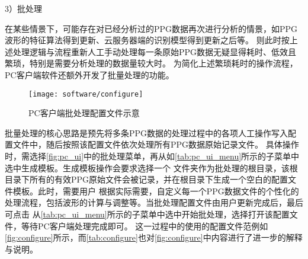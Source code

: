 3）批处理

在某些情景下，可能存在对已经分析过的PPG数据再次进行分析的情景，如PPG波形的特征算法得到更新、云服务器端的识别模型得到更新之后等。
则此时按上述处理逻辑与流程重新人工手动处理每一条原始PPG数据无疑显得耗时、低效且繁琐，特别是需要分析处理的数据量较大时。
为简化上述繁琐耗时的操作流程，PC客户端软件还额外开发了批量处理的功能。

\begin{figure}[htbp]
    \centering
    \texttt{[image: software/configure]}
    \caption{\label{fig:configure}PC客户端批处理配置文件示意}
\end{figure}

批量处理的核心思路是预先将多条PPG数据的处理过程中的各项人工操作写入配置文件中，随后按照该配置文件依次处理所有PPG数据原始记录文件。
具体操作时，需选择\autoref{fig:pc_ui}中的批处理菜单，再从如\autoref{tab:pc_ui_menu}所示的子菜单中选中生成模板。生成模板操作会要求选择一个
文件夹作为批处理的根目录，该根目录下所有的有效PPG原始文件会被记录，并在根目录下生成一个空白的配置文件模板。此时，需要用户
根据实际需要，自定义每一个PPG数据文件的个性化的处理流程，包括波形的计算与调整等。当批处理配置文件由用户更新完成后，最后可点击
从\autoref{tab:pc_ui_menu}所示的子菜单中选中开始批处理，选择打开该配置文件，等待PC客户端处理完成即可。
这一过程中的使用的配置文件范例如\autoref{fig:configure}所示，而\autoref{tab:configure}也对\autoref{fig:configure}中内容进行了进一步的解释与说明。


